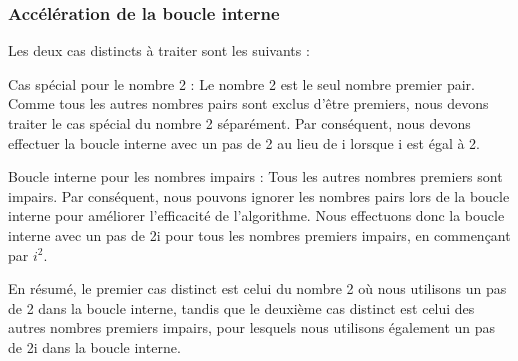 \documentclass[
]{article}
\begin{document}
\hypertarget{accuxe9luxe9ration-de-la-boucle-interne}{%
\subsubsection{Accélération de la boucle
interne}\label{accuxe9luxe9ration-de-la-boucle-interne}}

Les deux cas distincts à traiter sont les suivants :

Cas spécial pour le nombre 2 : Le nombre 2 est le seul nombre premier
pair. Comme tous les autres nombres pairs sont exclus d'être premiers,
nous devons traiter le cas spécial du nombre 2 séparément. Par
conséquent, nous devons effectuer la boucle interne avec un pas de 2 au
lieu de i lorsque i est égal à 2.

Boucle interne pour les nombres impairs : Tous les autres nombres
premiers sont impairs. Par conséquent, nous pouvons ignorer les nombres
pairs lors de la boucle interne pour améliorer l'efficacité de
l'algorithme. Nous effectuons donc la boucle interne avec un pas de 2i
pour tous les nombres premiers impairs, en commençant par \(i^2\).

En résumé, le premier cas distinct est celui du nombre 2 où nous
utilisons un pas de 2 dans la boucle interne, tandis que le deuxième cas
distinct est celui des autres nombres premiers impairs, pour lesquels
nous utilisons également un pas de 2i dans la boucle interne.
\end{document}

